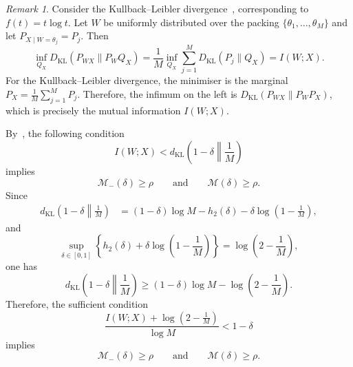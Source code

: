 \documentclass[11pt]{article}
\theoremstyle{definition}
\theoremstyle{remark}
\newtheorem{remark}[theorem]{Remark}
\newcommand{\1}{\boldsymbol{1}}
\begin{document}
\begin{remark} \label{rmk:classicalFano}
Consider the Kullback--Leibler divergence~\cite{KullbackLeibler1951},
corresponding to $f(t)=t\log t$.
Let $W$ be uniformly distributed over the packing
$\{\theta_1,\ldots,\theta_M\}$ and let
$P_{X\mid W=\theta_j}=P_j$. Then
\begin{equation}
    \inf_{Q_X}
    D_{\mathrm{KL}}(P_{WX}\|P_WQ_X)
    =
    \frac1M
    \inf_{Q_X}
    \sum_{j=1}^M
    D_{\mathrm{KL}}(P_j\|Q_X)
    =
    I(W;X).
\end{equation}
For the Kullback--Leibler divergence, the minimiser is the marginal
$P_X=\frac1M\sum_{j=1}^M P_j$. Therefore, the infimum on the left is
$D_{\mathrm{KL}}(P_{WX}\|P_WP_X)$, which is precisely the mutual
information $I(W;X)$.

By~, the following condition
\begin{equation}
    I(W;X)
    <
    d_{\mathrm{KL}}
    \left(
    1-\delta
    \middle\|
    \frac1M
    \right)
\end{equation}
implies
\begin{equation}
    \mathcal M_{-}(\delta)\geq\rho
    \qquad\text{and}\qquad
    \mathcal M(\delta)\geq\rho.
\end{equation}
Since
\begin{align}
    d_{\mathrm{KL}}
    \left(
    1-\delta
    \middle\|
    \frac1M
    \right)
    &=
    (1-\delta)\log M
    -
    h_2(\delta)
    -
    \delta\log\left(1-\frac1M\right),
\end{align}
and
\begin{equation}
    \sup_{\delta\in[0,1]}
    \left\{
    h_2(\delta)
    +
    \delta\log\left(1-\frac1M\right)
    \right\}
    =
    \log\left(2-\frac1M\right),
\end{equation}
one has
\begin{equation}
    d_{\mathrm{KL}}
    \left(
    1-\delta
    \middle\|
    \frac1M
    \right)
    \geq
    (1-\delta)\log M
    -
    \log\left(2-\frac1M\right).
\end{equation}
Therefore, the sufficient condition
\begin{equation}
    \frac{
    I(W;X)+\log\left(2-\frac1M\right)
    }{
    \log M
    }
    <
    1-\delta
\end{equation}
implies
\begin{equation}
    \mathcal M_{-}(\delta)\geq\rho
    \qquad\text{and}\qquad
    \mathcal M(\delta)\geq\rho.
\end{equation}


\end{remark}
\end{document}
